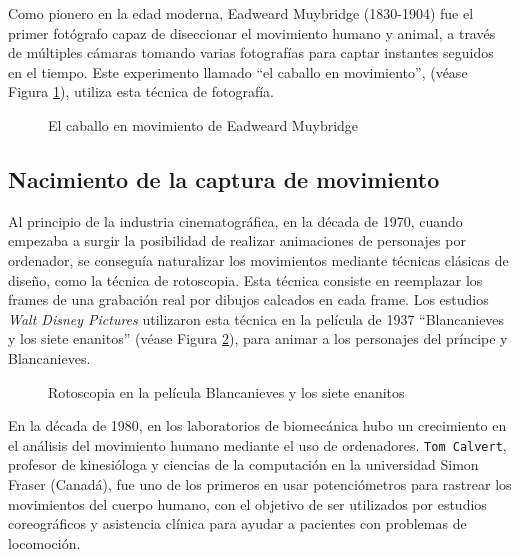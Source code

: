 Como pionero en la edad moderna, Eadweard Muybridge (1830-1904) fue el primer fotógrafo capaz de diseccionar el movimiento humano y animal, a través de múltiples cámaras tomando varias fotografías para captar instantes seguidos en el tiempo. Este experimento llamado ``el caballo en movimiento'', (véase Figura \ref{fig:EadweardMuybridgeHorse}),  utiliza esta técnica de fotografía.\cite{Mejias2014} \cite{Menendez2015}


\begin{figure}[h!]
    \centering
    \caption{El caballo en movimiento de Eadweard Muybridge}
    \label{fig:EadweardMuybridgeHorse}  
\end{figure}


\subsection{Nacimiento de la captura de movimiento}

Al principio de la industria cinematográfica, en la década de 1970, cuando empezaba a surgir la posibilidad de realizar animaciones de personajes por ordenador, se conseguía naturalizar los movimientos mediante técnicas clásicas de diseño, como la técnica de rotoscopia. 
Esta técnica consiste en reemplazar los frames de una grabación real por dibujos calcados en cada frame. Los estudios \textit{Walt Disney Pictures} utilizaron esta técnica en la película de 1937 ``Blancanieves y los siete enanitos'' (véase Figura \ref{fig:Blancanieves}),  para animar a los personajes del príncipe y Blancanieves. 

\begin{figure}[h!]
    \centering
    \caption{Rotoscopia en la película Blancanieves y los siete enanitos}
    \label{fig:Blancanieves}  
\end{figure}

En la década de 1980, en los laboratorios de biomecánica hubo un crecimiento en el análisis del movimiento humano mediante el uso de ordenadores. \texttt{Tom Calvert}, profesor de kinesióloga y ciencias de la computación en la universidad Simon Fraser (Canadá), fue uno de los primeros en usar potenciómetros para rastrear los movimientos del cuerpo humano, con el objetivo de ser utilizados por estudios coreográficos y asistencia clínica para ayudar a pacientes con problemas de locomoción.

